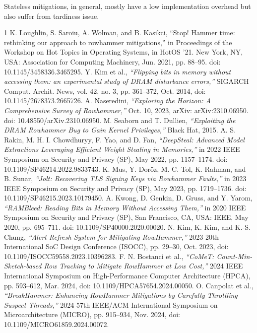 \documentclass[journal,twocolumn]{IEEEtran}
\begin{document}
	Stateless mitigations, in general, mostly have a low implementation overhead but also suffer from tardiness issue\cite{Qureshi24}.
	
	\begin{thebibliography}{1}
		K. Loughlin, S. Saroiu, A. Wolman, and B. Kasikci, “Stop! Hammer time: rethinking our approach to rowhammer mitigations,” in Proceedings of the Workshop on Hot Topics in Operating Systems, in HotOS ’21. New York, NY, USA: Association for Computing Machinery, Jun. 2021, pp. 88–95. doi: 10.1145/3458336.3465295.
		Y. Kim et al., \textit{“Flipping bits in memory without accessing them: an experimental study of DRAM disturbance errors,”} SIGARCH Comput. Archit. News, vol. 42, no. 3, pp. 361–372, Oct. 2014, doi: 10.1145/2678373.2665726.
		A. Naseredini, \textit{“Exploring the Horizon: A Comprehensive Survey of Rowhammer,”} Oct. 10, 2023, arXiv: arXiv:2310.06950. doi: 10.48550/arXiv.2310.06950.
		M. Seaborn and T. Dullien, \textit{“Exploiting the DRAM Rowhammer Bug to Gain Kernel Privileges,”} Black Hat, 2015.
		A. S. Rakin, M. H. I. Chowdhuryy, F. Yao, and D. Fan, \textit{“DeepSteal: Advanced Model Extractions Leveraging Efficient Weight Stealing in Memories,”} in 2022 IEEE Symposium on Security and Privacy (SP), May 2022, pp. 1157–1174. doi: 10.1109/SP46214.2022.9833743.
		K. Mus, Y. Doröz, M. C. Tol, K. Rahman, and B. Sunar, \textit{“Jolt: Recovering TLS Signing Keys via Rowhammer Faults,”} in 2023 IEEE Symposium on Security and Privacy (SP), May 2023, pp. 1719–1736. doi: 10.1109/SP46215.2023.10179450.
		A. Kwong, D. Genkin, D. Gruss, and Y. Yarom, \textit{“RAMBleed: Reading Bits in Memory Without Accessing Them,”} in 2020 IEEE Symposium on Security and Privacy (SP), San Francisco, CA, USA: IEEE, May 2020, pp. 695–711. doi: 10.1109/SP40000.2020.00020.
		N. Kim, K. Kim, and K.-S. Chung, \textit{“Alert Refresh System for Mitigating RowHammer,”} 2023 20th International SoC Design Conference (ISOCC), pp. 29–30, Oct. 2023, doi: 10.1109/ISOCC59558.2023.10396283.
		F. N. Bostanci et al., \textit{“CoMeT: Count-Min-Sketch-based Row Tracking to Mitigate RowHammer at Low Cost,”} 2024 IEEE International Symposium on High-Performance Computer Architecture (HPCA), pp. 593–612, Mar. 2024, doi: 10.1109/HPCA57654.2024.00050.
		O. Canpolat et al., \textit{“BreakHammer: Enhancing RowHammer Mitigations by Carefully Throttling Suspect Threads,”} 2024 57th IEEE/ACM International Symposium on Microarchitecture (MICRO), pp. 915–934, Nov. 2024, doi: 10.1109/MICRO61859.2024.00072.

\end{thebibliography}
\end{document}
